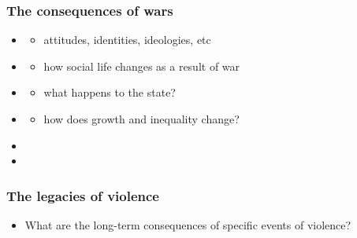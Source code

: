 \documentclass[aspectratio=43]{beamer}
\begin{document}
\begin{frame}
\frametitle{The consequences of wars}
\centering

\begin{itemize}
  \item {}
  \begin{itemize}
    \item attitudes, identities, ideologies, etc
  \end{itemize}
  \item {}
  \begin{itemize}
    \item how social life changes as a result of war
  \end{itemize}
  \item {}
  \begin{itemize}
    \item what happens to the state?
  \end{itemize}
  \item {}
  \begin{itemize}
    \item how does growth and inequality change?
  \end{itemize}
  \item<5->[]
  \item<5-> 
\end{itemize}

\end{frame}

\begin{frame}
\frametitle{The legacies of violence}
\centering

\begin{itemize}
  \item What are the long-term consequences of specific events of violence?
\end{itemize}

\end{frame}


\end{document}
